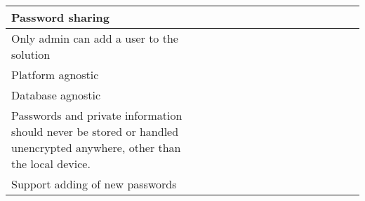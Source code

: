 \begin{longtable}{ p{3cm} l l l l l l l l l l l l l l}
\hline 																																																																																																																																										
Password sharing																												&\red{\xmark}								&\green{\cmark}							&\red{\xmark}							&\green{\cmark}		&\red{\xmark}		&\green{\cmark}		&\green{\cmark}		&\green{\cmark}				&\green{\cmark}		&\green{\cmark}		&\yellow{\cmark}	&\red{\xmark}		&\green{\cmark}		&\green{\cmark}	\\		
\hline 																																																																																																																																											
Only admin can add a user to the solution																						&\grey{}									&\grey{ }								&\grey{ }								&\red{\xmark}		&\red{\xmark}		&\red{\xmark}		&\red{\xmark}		&\red{\xmark}				&\red{\xmark}		&\red{\xmark}		&\red{\xmark}		&\grey{ }			&\red{\xmark}		&\red{\xmark}		\\	
\hline 																																																																																																																																													
Platform agnostic																												&\green{\cmark}								&\green{\cmark}							&\yellow{\cmark}						&\green{\cmark}		&\yellow{\cmark}	&\red{\xmark}		&\grey{ }			&\green{\cmark}				&\green{\cmark}		&\green{\cmark}		&\green{\cmark}		&\green{\cmark}		&\yellow{\cmark}	&\green{\cmark}	\\		
\hline 																																																																																																																																												
Database agnostic																												&\grey{}									&\grey{ }								&\red{\xmark}							&\green{\cmark}		&\red{\xmark}		&\red{\xmark}		&\grey{ }			&\red{\xmark}				&\red{\xmark}		&\white{ }			&\yellow{\cmark}	&\grey{ }			&\red{\xmark}		&\red{\xmark}		\\	
\hline 																																																																																																																																											
Passwords and private information should never be stored or handled unencrypted anywhere, other than the local device.			&\yellow{\cmark}							&\yellow{\cmark}						&\green{\cmark}							&\red{\xmark}		&\white{}			&\white{}			&\white{ }			&\white{ }					&\white{ }			&\white{ }			&\red{\xmark}		&\green{\cmark}		&\red{\xmark}		&\white{ }	\\		
\hline 																																																																																																																																													
Support adding of new passwords																									&\green{\cmark}								&\green{\cmark}							&\green{\cmark}							&\green{\cmark}		&\green{\cmark}		&\green{\cmark}		&\green{\cmark}		&\green{\cmark}				&\green{\cmark}		&\green{\cmark}		&\green{\cmark}		&\green{\cmark}		&\green{\cmark}		&\green{\cmark}	\\		

\end{longtable}
